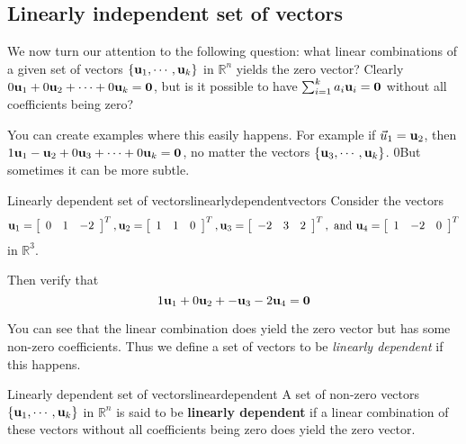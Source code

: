 \subsection{Linearly independent set of vectors}

We now turn our attention to the following question: what linear
combinations of a given set of vectors $\{ {\bf u}_1, \cdots
,{\bf u}_k\}$ in $\mathbb{R}^{n}$ yields the zero vector? Clearly
$0{\bf u}_1 + 0{\bf u}_2+ \cdots + 0 {\bf u}_k = {\bf 0}$, but is
it possible to have $\sum_{i=1}^{k}a_{i}{\bf u}_{i}={\bf 0}$ without
all coefficients being zero?

You can create examples where this easily happens. For example if $\vec{u}_1={\bf u}_2$, then 
$1{\bf u}_1 - {\bf u}_2+ 0 {\bf u}_3 + \cdots  + 0 {\bf u}_k = {\bf 0}$, no matter the vectors 
 $\{ {\bf u}_3, \cdots ,{\bf u}_k\}$. 0But sometimes it can be more subtle. 

\begin{example}{Linearly dependent set of vectors}{linearlydependentvectors}
Consider the vectors 
\begin{equation*}
{\bf u}_1=\left[ 
\begin{array}{rrr}
0  & 1 & -2
\end{array}
\right]^T, 
{\bf u}_2=\left[ 
\begin{array}{rrr}
1  & 1 & 0
\end{array}
\right]^T, 
{\bf u}_3=\left[ 
\begin{array}{rrr}
-2  & 3 & 2
\end{array}
\right]^T, \mbox{ and } 
{\bf u}_4=\left[ 
\begin{array}{rrr}
1  & -2 & 0
\end{array}
\right]^T
\end{equation*}
in $\mathbb{R}^{3}$.

Then verify that 
\begin{equation*}
1{\bf u}_1 +0 {\bf u}_2+ - {\bf u}_3 -2 {\bf u}_4 = {\bf 0}
\end{equation*}
\end{example}

You can see that the linear combination does yield the zero vector but
has some non-zero coefficients. Thus we define a set of vectors to be
{\em linearly dependent} if this happens.

\begin{definition}{Linearly dependent set of vectors}{lineardependent}
A set of non-zero vectors $\{ {\bf u}_1, \cdots ,{\bf u}_k\}$ in $\mathbb{R}^{n}$ is said to be 
\textbf{linearly dependent} if a linear combination of these vectors without all  coefficients being zero does yield the zero vector.
\end{definition}

